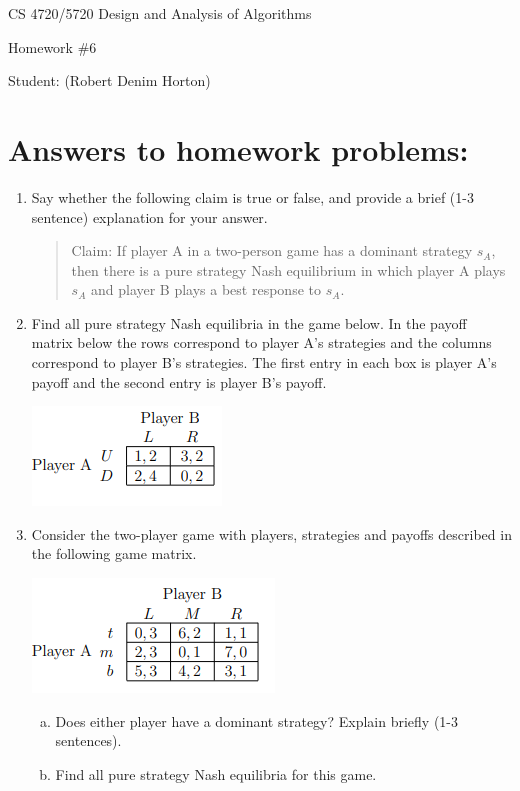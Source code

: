 \documentclass[11pt]{article}
\begin{document}
 

\rhead{\today}

\begin{center}\begin{Large}
CS 4720/5720 Design and Analysis of Algorithms

Homework \#6

Student: (Robert Denim Horton)
\end{Large}
\end{center}


\section*{Answers to homework problems:}

\begin{enumerate}
	\item Say whether the following claim is true or false, and provide a brief (1-3 sentence) explanation for your answer. \\
	\begin{quote}
		 Claim: If player A in a two-person game has a dominant strategy $s_A$, then there is a pure strategy Nash equilibrium in which player A plays $s_A$ and player B plays a best response to $s_A$. 
	\end{quote}

	\setcounter{enumi}{2}
	\item Find all pure strategy Nash equilibria in the game below. In the payoff matrix below the rows correspond to player A’s strategies and the columns correspond to player B’s strategies. The first entry in each box is player A’s payoff and the second entry is player B’s payoff.
	\begin{center}
		\includegraphics[scale=1.0]{Figure1.1}
	\end{center}
	\item  Consider the two-player game with players, strategies and payoffs described in the following game matrix.
	\begin{center}
		\includegraphics[scale=1.0]{Figure1.2}
	\end{center}
	\begin{enumerate}[(a)]
		\item Does either player have a dominant strategy? Explain briefly (1-3 sentences).
		\item Find all pure strategy Nash equilibria for this game.
	\end{enumerate}


\end{enumerate}
\end{document}

